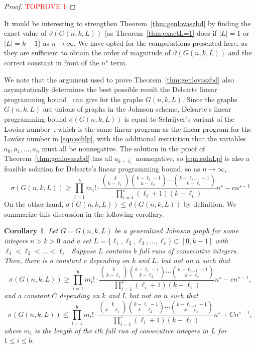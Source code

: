 \documentclass[11pt]{article}
\newtheorem{corollary}[theorem]{Corollary}
\theoremstyle{definition}
\theoremstyle{remark}
\begin{document}
\begin{proof}\textcolor{red}{TOPROVE 1}\end{proof}

It would be interesting to strengthen Theorem~\ref{thm:genlovaszbd} by finding the exact value of $\vartheta(G(n, k, L))$ (as Theorem~\ref{thm:exactL=1} does if $|L|=1$ or $|L| = k-1$) as $n\rightarrow\infty$. We have opted for the  computations presented here, as they are sufficient to obtain the order of magnitude of $\vartheta(G(n, k, L))$ and the correct constant in front of the $n^{s}$ term. 

We note that the argument used to prove Theorem~\ref{thm:genlovaszbd} also asymptotically determines the best possible result the Delsarte linear programming bound~\cite{Del1973, Sch1979} can give for the graphs $G(n, k, L)$. Since the graphs $G(n, k, L)$ are unions of graphs in the Johnson scheme, Delsarte's linear programming bound $\sigma(G(n, k, L))$ is equal to Schrijver's variant of the Lov\'asz number~\cite{Sch1979}, which is the same linear program as the linear program for the Lov\'asz number in \eqref{eqn:schlp}, with the additional restriction that the variables $a_{0}, a_{1}, \ldots, a_{n}$ must all be nonnegative. The solution in the proof of Theorem~\ref{thm:genlovaszbd} has all $a_{k-\ell_i}$ nonnegative, so \eqref{eqn:solnLp} is also a feasible solution for Delsarte's linear programming bound, so as $n\rightarrow\infty$,
\[\sigma(G(n, k, L)) \ge \prod_{i=1}^{b}m_i!\cdot\frac{\binom{k}{k-\ell_1}\binom{k-\ell_1-1}{k-\ell_2}\cdots \binom{k-\ell_{s-1}-1}{k-\ell_s}}{\prod_{i=1}^s(\ell_i+1)(k-\ell_i)}n^s - cn^{s-1}\]
On the other hand, $\sigma(G(n, k, L)) \le \vartheta(G(n, k, L))$ by definition. We summarize this discussion in the following corollary. 

\begin{corollary}\label{cor:delsartelp}
Let $G = G(n, k, L)$ be a generalized Johnson graph for some integers $n > k > 0$ and a set $L = \{\ell_1, \ell_2, \ell_3, \ldots, \ell_s\} \subset [0, k-1]$ with $\ell_1 < \ell_2 < \ldots < \ell_s$. Suppose $L$ contains $b$ full runs of consecutive integers. Then, there is a constant $c$ depending on $k$ and $L$, but not on $n$ such that 
\[\sigma(G(n, k, L))\ge \prod_{i=1}^{b}m_i!\cdot\frac{\binom{k}{k-\ell_1}\binom{k-\ell_1-1}{k-\ell_2}\cdots \binom{k-\ell_{s-1}-1}{k-\ell_s}}{\prod_{i=1}^s(\ell_i+1)(k-\ell_i)}n^s -cn^{s-1} ,\]
and a constant $C$ depending on $k$ and $L$ but not on $n$ such that
\[\sigma(G(n, k, L))\le \prod_{i=1}^{b}m_i!\cdot\frac{\binom{k}{k-\ell_1}\binom{k-\ell_1-1}{k-\ell_2}\cdots \binom{k-\ell_{s-1}-1}{k-\ell_s}}{\prod_{i=1}^s(\ell_i+1)(k-\ell_i)}n^s +Cn^{s-1},\]
where $m_i$ is the length of the $i$th full run of consecutive integers in $L$ for $1\le i\le b$. 
\end{corollary}
\end{document}
